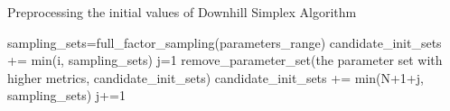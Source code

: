 \documentclass[gmd, manuscript]{copernicus}
\begin{document}




\begin{algorithm}[htb]
\caption{Preprocessing the initial values of Downhill Simplex Algorithm} 
\label{alg:sequential-operation}
\begin{algorithmic}
\STATE sampling\_sets=full\_factor\_sampling(parameters\_range)
\STATE candidate\_init\_sets += min(i, sampling\_sets)
\ENDFOR
{}
\STATE j=1
\STATE remove\_parameter\_set(the parameter set with higher metrics, candidate\_init\_sets)
\STATE candidate\_init\_sets += min(N+1+j, sampling\_sets)
\STATE j+=1
\ENDWHILE
\end{algorithmic}
\end{algorithm}








\end{document}
